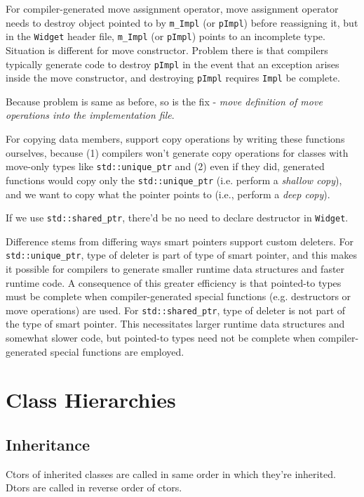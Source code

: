 \documentclass[10pt]{amsart}
\begin{document}
\begin{multicols*}{2}
For compiler-generated move assignment operator, move assignment operator needs to destroy object pointed to by \verb|m_Impl| (or \verb|pImpl|) before reassigning it, but in the \verb|Widget| header file, \verb|m_Impl| (or \verb|pImpl|) points to an incomplete type.  Situation is different for move constructor.  Problem there is that compilers typically generate code to destroy \verb|pImpl| in the event that an exception arises inside the move constructor, and destroying \verb|pImpl| requires \verb|Impl| be complete.  

Because problem is same as before, so is the fix - \emph{move definition of move operations into the implementation file}.  

For copying data members, support copy operations by writing these functions ourselves, because (1) compilers won't generate copy operations for classes with move-only types like \verb|std::unique_ptr| and (2) even if they did, generated functions would copy only the \verb|std::unique_ptr| (i.e. perform a \emph{shallow copy}), and we want to copy what the pointer points to (i.e., perform a \emph{deep copy}).  

If we use \verb|std::shared_ptr|, there'd be no need to declare destructor in \verb|Widget|.  

Difference stems from differing ways smart pointers support custom deleters.  For \verb|std::unique_ptr|, type of deleter is part of type of smart pointer, and this makes it possible for compilers to generate smaller runtime data structures and faster runtime code.  A consequence of this greater efficiency is that pointed-to types must be complete when compiler-generated special functions (e.g. destructors or move operations) are used.  For \verb|std::shared_ptr|, type of deleter is not part of the type of smart pointer.  This necessitates larger runtime data structures and somewhat slower code, but pointed-to types need not be complete when compiler-generated special functions are employed.  

\section{Class Hierarchies}

\subsection{Inheritance}

Ctors of inherited classes are called in same order in which they're inherited. Dtors are called in reverse order of ctors.


\end{multicols*}
\end{document}
